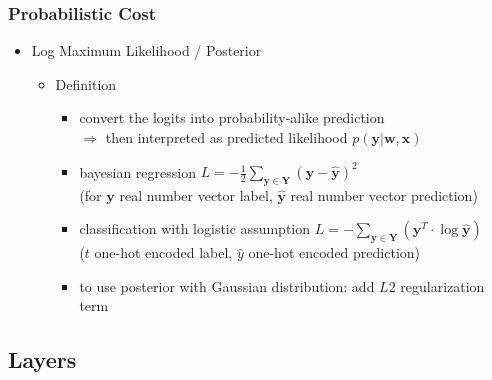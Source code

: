 \subsubsection{Probabilistic Cost}
\begin{itemize}
\item Log Maximum Likelihood / Posterior
	\begin{itemize}
	\item Definition
		\begin{itemize}
		\item convert the logits into probability-alike prediction \\ 
		$\Rightarrow$ then interpreted as predicted likelihood $p(\mathbf y|\mathbf w, \mathbf x)$
		\item bayesian regression $\displaystyle L = -\frac 1 2\sum_{\mathbf y\in \mathbf Y} (\mathbf y - \hat {\mathbf y})^2$ \\
		(for $\mathbf y$ real number vector label, $\hat {\mathbf y}$ real number vector prediction)
		\item classification with logistic assumption $\displaystyle L = -\sum_{\mathbf y\in\mathbf Y}(\mathbf y^T \cdot \log \hat {\mathbf y})$ \\
		($t$ one-hot encoded label, $\hat y$ one-hot encoded prediction)
		\item to use posterior with Gaussian distribution: add $L2$ regularization term
		\end{itemize}
	\end{itemize}
\end{itemize}


\subsection{Layers}

